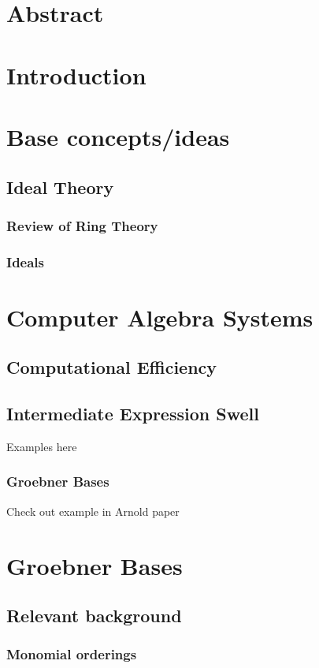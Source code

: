 \documentclass{article}
\begin{document}
\newpage
{}

\section{Abstract}

\section{Introduction}

\section{Base concepts/ideas}
\subsection{Ideal Theory}
\subsubsection{Review of Ring Theory}
\subsubsection{Ideals}
\section{Computer Algebra Systems}
\subsection{Computational Efficiency}
\subsection{Intermediate Expression Swell}
Examples here
\subsubsection{Groebner Bases}
Check out example in Arnold paper

\section{Groebner Bases}
\subsection{Relevant background}
\subsubsection{Monomial orderings}
\end{document}

